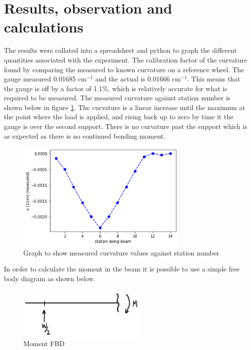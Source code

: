 \documentclass[12pt]{article}
\begin{document}
    \section{Results, observation and calculations}
        The results were collated into a spreadsheet and python to graph the different quantities associated with the experiment. The calibration factor of the curvature found
        by comparing the measured to known curvature on a reference wheel. The gauge measured 0.01685 cm$^{-1}$ and the actual is 0.01666 cm$^{-1}$. This means that the
        gauge is off by a factor of 1.1\%, which is relatively accurate for what is required to be measured. The measured curvature against station number is shown below in 
        figure \ref{kappa_measured_station}.  The curvature is a linear increase until the maximum at the point where the load is applied, and rising back up to zero by time it the gauge is over
        the second support. There is no curvature past the support which is as expected as there is no continued bending moment.
        \begin{figure}[H]
            \centering
            \captionsetup{labelfont=bf}
            \includegraphics[width=20pc]{kappa_measured_station.png}
            \caption{Graph to show measured curvature values against station number}\label{kappa_measured_station}
        \end{figure}
        In order to calculate the moment in the beam it is possible to use a simple free body diagram as shown below.
        \begin{figure}[H]
            \centering
            \captionsetup{labelfont=bf}
            \includegraphics[width=15pc]{momentFBD.png}
            \caption{Moment FBD}\label{momentFBD}
        \end{figure}
\end{document}
